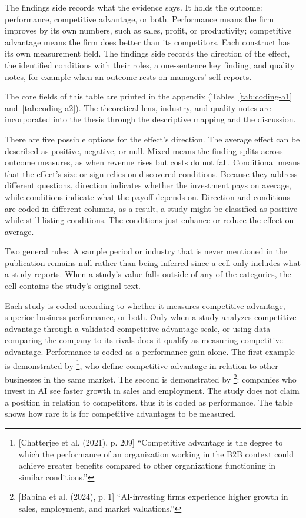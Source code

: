 The findings side records what the evidence says. It holds the outcome: performance, competitive advantage, or both. Performance means the firm improves by its own numbers, such as sales, profit, or productivity; competitive advantage means the firm does better than its competitors. Each construct has its own measurement field. The findings side records the direction of the effect, the identified conditions with their roles, a one-sentence key finding, and quality notes, for example when an outcome rests on managers' self-reports.

The core fields of this table are printed in the appendix (Tables~\ref{tab:coding-a1} and~\ref{tab:coding-a2}). The theoretical lens, industry, and quality notes are incorporated into the thesis through the descriptive mapping and the discussion.

There are five possible options for the effect's direction. The average effect can be described as positive, negative, or null. Mixed means the finding splits across outcome measures, as when revenue rises but costs do not fall. Conditional means that the effect's size or sign relies on discovered conditions. Because they address different questions, direction indicates whether the investment pays on average, while conditions indicate what the payoff depends on. Direction and conditions are coded in different columns, as a result, a study might be classified as positive while still listing conditions. The conditions just enhance or reduce the effect on average.

Two general rules: A sample period or industry that is never mentioned in the publication remains null rather than being inferred since a cell only includes what a study reports. When a study's value falls outside of any of the categories, the cell contains the study's original text.

Each study is coded according to whether it measures competitive advantage, superior business performance, or both. Only when a study analyzes competitive advantage through a validated competitive-advantage scale, or using data comparing the company to its rivals does it qualify as measuring competitive advantage. Performance is coded as a performance gain alone. The first example is demonstrated by \textcite[p.~209]{chatterjee2021effect}\footnote{[Chatterjee et al. (2021), p. 209] ``Competitive advantage is the degree to which the performance of an organization working in the B2B context could achieve greater benefits compared to other organizations functioning in similar conditions.''}, who define competitive advantage in relation to other businesses in the same market. The second is demonstrated by \textcite[p.~1]{babina2024artificial}\footnote{[Babina et al. (2024), p. 1] ``AI-investing firms experience higher growth in sales, employment, and market valuations.''}: companies who invest in AI see faster growth in sales and employment. The study does not claim a position in relation to competitors, thus it is coded as performance. The table shows how rare it is for competitive advantages to be measured.

